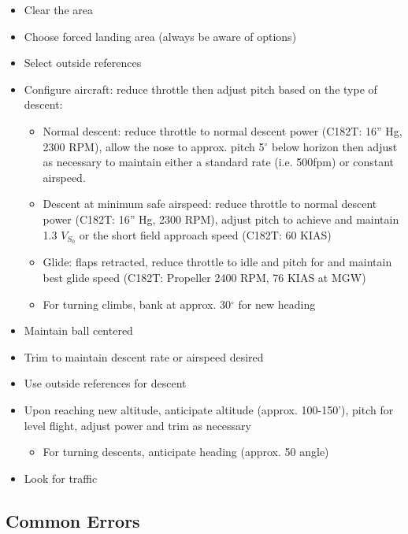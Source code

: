 \begin{itemize}
  \item Clear the area
  \item Choose forced landing area (always be aware of options) 
  \item Select outside references
  \item Configure aircraft: reduce throttle then adjust pitch based on the type
    of descent:
    \begin{itemize}
      \item Normal descent: reduce throttle to normal descent power (C182T:
        16'' Hg, 2300 RPM), allow the nose to approx. pitch 5$^\circ$ below
        horizon then adjust as necessary to maintain either a standard rate
        (i.e.  500fpm) or constant airspeed.
      \item Descent at minimum safe airspeed: reduce throttle to normal descent
        power (C182T: 16'' Hg, 2300 RPM), adjust pitch to achieve and maintain
        1.3 $V_{S_0}$ or the short field approach speed (C182T: 60 KIAS)
      \item Glide: flaps retracted, reduce throttle to idle and pitch for and
        maintain best glide speed (C182T: Propeller 2400 RPM, 76 KIAS at MGW)
      \item For turning climbs, bank at approx. 30$^\circ$ for new heading
    \end{itemize}
  \item Maintain ball centered
  \item Trim to maintain descent rate or airspeed desired
  \item Use outside references for descent
  \item Upon reaching new altitude, anticipate altitude (approx. 100-150'),
    pitch for level flight, adjust power and trim as necessary
    \begin{itemize}
      \item For turning descents, anticipate heading (approx. 50%
        angle)
    \end{itemize}
  \item Look for traffic
\end{itemize}

\subsection{Common Errors}

